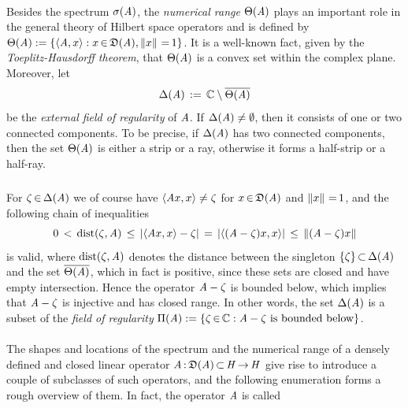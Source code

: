 \documentclass[11pt,twoside]{article}
\begin{document}
\paragraph{} %
Besides the spectrum $\sigma(\mathit{A})$,
the \textit{numerical range} $\Theta(\mathit{A})$ plays an important role
in the general theory of Hilbert space operators and is defined by
$\Theta(\mathit{A}) :=
\{ \langle \mathit{A},x \rangle: x {\,\in\,} \mathfrak{D}(\mathit{A}), \left\lVert x \right\rVert {\,=\,} 1 \}$.
It is a well-known fact,
given by the \textit{Toeplitz-Hausdorff theorem},
that $\Theta(\mathit{A})$ is a convex set within the complex plane.
Moreover,
let
\[
\Delta(\mathit{A}) \,:=\, {\mathbb{C}} \setminus \overline{\Theta(\mathit{A})}
\]
be the \textit{external field of regularity} of $\mathit{A}$.
If $\Delta(\mathit{A}) \neq \emptyset$,
then it consists of one or two connected components.
To be precise,
if $\Delta(\mathit{A})$ has two connected components,
then the set $\Theta(\mathit{A})$ is either a strip or a ray,
otherwise it forms a half-strip or a half-ray.

\subparagraph{}
For $\zeta {\,\in\,} \Delta(\mathit{A})$ we of course have
$\langle \mathit{A} x,x \rangle \neq \zeta$
for $x {\,\in\,} \mathfrak{D}(\mathit{A})$ and $\left\lVert x \right\rVert {\,=\,} 1$,
and the following chain of inequalities
\[
0 \, < \, \mbox{dist}(\zeta,\linA) \, \leq \,
\abs{\scalar{\linA x}{x} - \zeta} \=
\abs{\scalar{(\linA-\zeta)x}{x}} \, \leq \,
\norm{(\linA -\zeta) x}
\]
is valid,
where $\mbox{dist}(\zeta,\mathit{A})$ denotes the distance
between the singleton $\{\zeta\} {\,\subset\,} \Delta(\mathit{A})$
and the set $\overline{\Theta(\mathit{A})}$,
which in fact is positive,
since these sets are closed and have empty intersection.
Hence the operator $\mathit{A} -\zeta$ is bounded below,
which implies
that $\mathit{A}-\zeta$ is injective and has closed range.
In other words,
the set $\Delta(\mathit{A})$ is a subset of the \textit{field of regularity}
$\Pi(\mathit{A}) := \{\zeta {\,\in\,} {\mathbb{C}}: \mathit{A}-\zeta \mbox{ is bounded below}\}$.

\paragraph{} %
The shapes and locations 
of the spectrum and the numerical range of
a densely defined and closed linear operator
$\mathit{A} {\,:\,} \mathfrak{D}(\mathit{A}) {\,\subset\,} \mathit{H} {\,\to\,} \mathit{H}$
give rise to introduce a couple of subclasses of such operators,
and the following enumeration forms a rough overview of them.
In fact,
the operator $\mathit{A}$ is called
\end{document}
